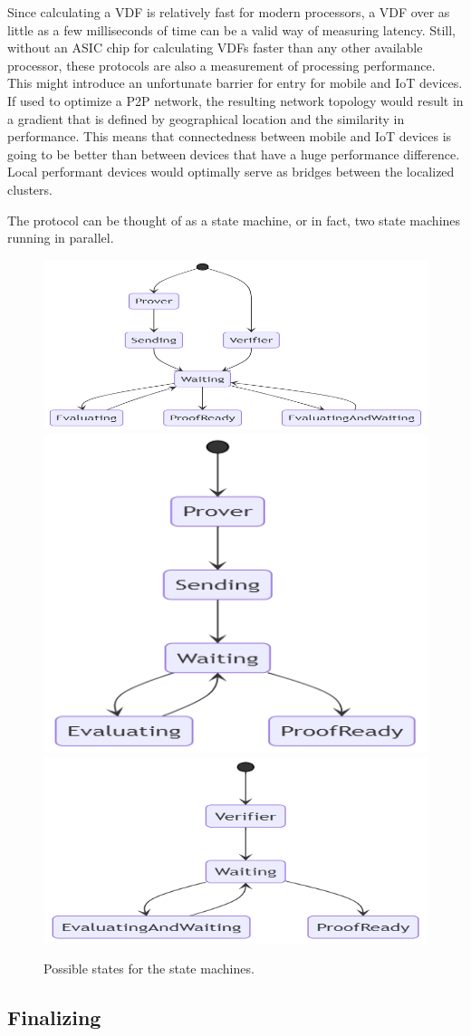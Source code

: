 Since calculating a VDF is relatively fast for modern processors, a VDF over as little as a few milliseconds of time can be a valid way of measuring latency. Still, without an ASIC chip for calculating VDFs faster than any other available processor, these protocols are also a measurement of processing performance. This might introduce an unfortunate barrier for entry for mobile and IoT devices. If used to optimize a P2P network, the resulting network topology would result in a gradient that is defined by geographical location and the similarity in performance. This means that connectedness between mobile and IoT devices is going to be better than between devices that have a huge performance difference. Local performant devices would optimally serve as bridges between the localized clusters.

The protocol can be thought of as a state machine, or in fact, two state machines running in parallel.

\begin{figure}[htp]

  \centering
  \includegraphics[width=.3\textwidth]{pictures/mermaid-diagram-20210505012010.png}\hfill
  \includegraphics[width=.3\textwidth]{pictures/mermaid-diagram-20210505014229.png}\hfill
  \includegraphics[width=.3\textwidth]{pictures/mermaid-diagram-20210505015712.png}

  \caption{Possible states for the state machines.}
  \label{Protocol States}

\end{figure}

\subsection{Finalizing}

